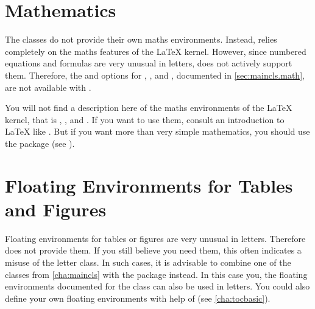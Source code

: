 



\section{Mathematics}
%
\BeginIndexGroup
{}%
%
%

The \KOMAScript{} classes do not provide their own maths environments.
Instead, \KOMAScript{} relies completely on the maths features of the \LaTeX{}
kernel. However, since numbered equations and formulas
are very unusual in letters, \KOMAScript{} does not actively support them.
Therefore, the  and
 options for , ,
and , documented in \autoref{sec:maincls.math}, are not
available with .

You will not find a description here of the maths environments of the \LaTeX{}
kernel, that is ,
, and
. If you want to use them, consult an
introduction to \LaTeX{} like \cite{lshort}. But if you want
more than very simple mathematics, you should use the 
package (see \cite{package:amsmath}).%
%
\EndIndexGroup


\section{Floating Environments for Tables and Figures}

Floating environments for tables or figures are very unusual in letters.
Therefore  does not provide them. If you
still believe you need them, this often indicates a misuse of the letter
class. In such cases, it is advisable to combine one of the \KOMAScript{}
classes from \autoref{cha:maincls} with the
 package instead. In this
case you, the floating environments documented for the class can also be used
in letters. You could also define your own floating environments with help of
 (see \autoref{cha:tocbasic}).

